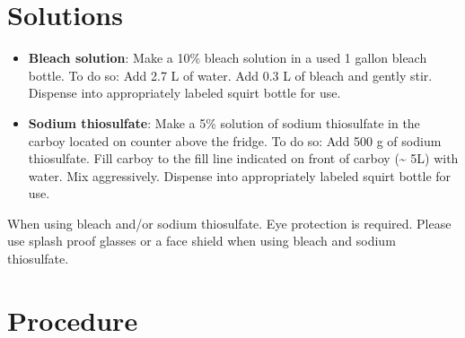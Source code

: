 \documentclass[
  letterpaper,
  DIV=11,
  numbers=noendperiod]{scrreprt}
\providecommand{\tightlist}{%
  \setlength{\itemsep}{0pt}\setlength{\parskip}{0pt}}\usepackage{longtable,booktabs,array}
\begin{document}
\hypertarget{solutions-22}{%
\section{Solutions}\label{solutions-22}}

\begin{itemize}
\tightlist
\item
  \textbf{Bleach solution}: Make a 10\% bleach solution in a used 1
  gallon bleach bottle. To do so: Add 2.7 L of water. Add 0.3 L of
  bleach and gently stir. Dispense into appropriately labeled squirt
  bottle for use.
\item
  \textbf{Sodium thiosulfate}: Make a 5\% solution of sodium thiosulfate
  in the carboy located on counter above the fridge. To do so: Add 500 g
  of sodium thiosulfate. Fill carboy to the fill line indicated on front
  of carboy (\textasciitilde{} 5L) with water. Mix aggressively.
  Dispense into appropriately labeled squirt bottle for use.
\end{itemize}

\begin{tcolorbox}[enhanced jigsaw, rightrule=.15mm, title=\textcolor{quarto-callout-caution-color}{\faFire}\hspace{0.5em}{Chemical Hygiene}, titlerule=0mm, opacitybacktitle=0.6, toprule=.15mm, bottomrule=.15mm, opacityback=0, left=2mm, colframe=quarto-callout-caution-color-frame, breakable, coltitle=black, colback=white, colbacktitle=quarto-callout-caution-color!10!white, bottomtitle=1mm, leftrule=.75mm, toptitle=1mm, arc=.35mm]

When using bleach and/or sodium thiosulfate. Eye protection is required.
Please use splash proof glasses or a face shield when using bleach and
sodium thiosulfate.

\end{tcolorbox}

\hypertarget{procedure-27}{%
\section{Procedure}\label{procedure-27}}
\end{document}

